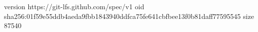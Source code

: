 version https://git-lfs.github.com/spec/v1
oid sha256:01f59e55ddb4aeda9fbb1843940ddfca75fe641cbfbee13f0b81daff77595545
size 87540

